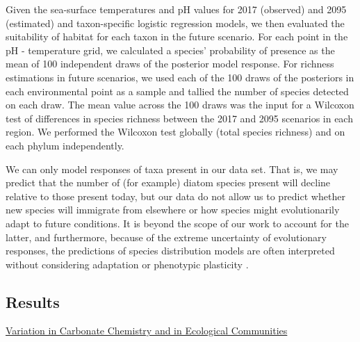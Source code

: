 \documentclass[11pt]{article}
\begin{document}
\begin{linenumbers}
Given the sea-surface temperatures and pH values for 2017 (observed) and 2095 (estimated) and taxon-specific logistic regression models, we then evaluated the suitability of habitat for each taxon in the future scenario. For each point in the pH - temperature grid, we calculated a species' probability of presence as the mean of 100 independent draws of the posterior model response. For richness estimations in future scenarios, we used each of the 100 draws of the posteriors in each environmental point as a sample and tallied the number of species detected on each draw. The mean value across the 100 draws was the input for a Wilcoxon test of differences in species richness between the 2017 and 2095 scenarios in each region. We performed the Wilcoxon test globally (total species richness) and on each phylum independently. 

We can only model responses of taxa present in our data set. That is, we may predict that the number of (for example) diatom species present will decline relative to those present today, but our data do not allow us to predict whether new species will immigrate from elsewhere or how species might evolutionarily adapt to future conditions. It is beyond the scope of our work to account for the latter, and furthermore, because of the extreme uncertainty of evolutionary responses, the predictions of species distribution models are often interpreted without considering adaptation or phenotypic plasticity \cite{moore2015present}. 



\subsection*{Results}
\underline{Variation in Carbonate Chemistry and in Ecological Communities}



\end{linenumbers}
\end{document}
